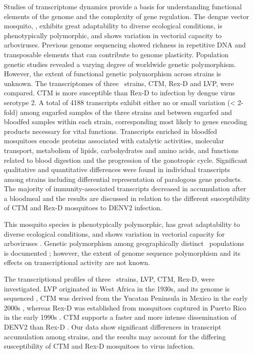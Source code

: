 


Studies of transcriptome dynamics provide a basis for understanding functional elements of the genome and the complexity of gene regulation.
The dengue vector mosquito, \Aea, exhibits great adaptability to diverse ecological conditions, is phenotypically polymorphic, and shows variation in vectorial capacity to arboviruses.
Previous genome sequencing showed richness in repetitive DNA and transposable elements that can contribute to genome plasticity.
Population genetic studies revealed a varying degree of worldwide genetic polymorphism.
However, the extent of functional genetic polymorphism across strains is unknown.
The transcriptomes of three \Aa\ strains, \gls{CTM}, \gls{Rex-D} and \gls{LVP}, were compared.
CTM is more susceptible than \gls{Rex-D} to infection by dengue virus serotype 2.
A total of 4188 transcripts exhibit either no or small variation (< 2-fold) among sugarfed samples of the three strains and between sugarfed and bloodfed samples within each strain, corresponding most likely to genes encoding products necessary for vital functions.
Transcripts enriched in bloodfed mosquitoes encode proteins associated with catalytic activities, molecular transport, metabolism of lipids, carbohydrates and amino acids, and functions related to blood digestion and the progression of the gonotropic cycle.
Significant qualitative and quantitative differences were found in individual transcripts among strains including differential representation of paralogous gene products.
The majority of immunity-associated transcripts decreased in accumulation after a bloodmeal and the results are discussed in relation to the different susceptibility of \gls{CTM} and \gls{Rex-D} mosquitoes to \gls{DENV2} infection.

This mosquito species is phenotypically polymorphic, has great adaptability to diverse ecological conditions, and shows variation in vectorial capacity for arboviruses \cite{Bennett2002,Black2002,Kuno2010}.
Genetic polymorphism among geographically distinct \Aa\ populations is documented \cite{Urdaneta-Marquez2011}; however, the extent of genome sequence polymorphism and its effects on transcriptional activity are not known.

The transcriptional profiles of three \Aa\ strains, \gls{LVP}, \gls{CTM}, \gls{Rex-D}, were investigated.
\gls{LVP} originated in West Africa in the 1930s, and its genome is sequenced \cite{Nene2007}, \gls{CTM} was derived from the Yucatan Peninsula in Mexico in the early 2000s \cite{Bennett2002,Gubler1985,Richardson2006a}, whereas \gls{Rex-D} was established from mosquitoes captured in Puerto Rico in the early 1990s \cite{Miller1991}.
\gls{CTM} supports a faster and more intense dissemination of \gls{DENV2} than \gls{Rex-D} \cite{Bennett2002,Salazar2007}.
Our data show significant differences in transcript accumulation among strains, and the results may account for the differing susceptibility of \gls{CTM} and \gls{Rex-D} mosquitoes to virus infection.


